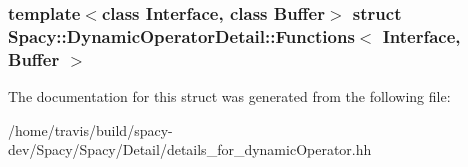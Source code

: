 \subsubsection*{template$<$class \-Interface, class \-Buffer$>$ struct Spacy\-::\-Dynamic\-Operator\-Detail\-::\-Functions$<$ Interface, Buffer $>$}



\-The documentation for this struct was generated from the following file\-:\begin{DoxyCompactItemize}
\item 
/home/travis/build/spacy-\/dev/\-Spacy/\-Spacy/\-Detail/details\-\_\-for\-\_\-dynamic\-Operator.\-hh\end{DoxyCompactItemize}
